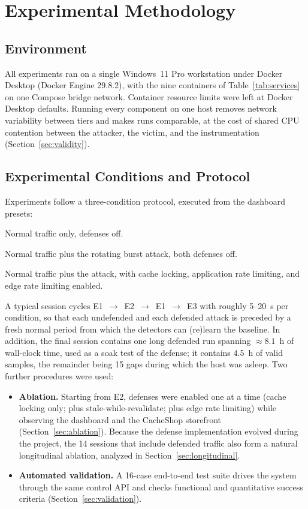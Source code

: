 \section{Experimental Methodology}
\label{sec:method}

\subsection{Environment}
All experiments ran on a single Windows~11 Pro workstation under Docker Desktop
(Docker Engine 29.8.2), with the nine containers of Table~\ref{tab:services} on one
Compose bridge network. Container resource limits were left at Docker Desktop defaults.
Running every component on one host removes network variability between tiers and
makes runs comparable, at the cost of shared CPU contention between the attacker,
the victim, and the instrumentation (Section~\ref{sec:validity}).

\subsection{Experimental Conditions and Protocol}
Experiments follow a three-condition protocol, executed from the dashboard presets:
\begin{description}[leftmargin=1.2em,style=nextline]
\item[E1 -- Baseline.] Normal traffic only, defenses off.
\item[E2 -- Attack, undefended.] Normal traffic plus the rotating burst attack, both
defenses off.
\item[E3 -- Attack, defended.] Normal traffic plus the attack, with cache locking,
application rate limiting, and edge rate limiting enabled.
\end{description}
A typical session cycles E1~$\rightarrow$~E2~$\rightarrow$~E1~$\rightarrow$~E3 with
roughly 5--20~s per condition, so that each undefended and each defended attack is
preceded by a fresh normal period from which the detectors can (re)learn the
baseline. In addition, the final session contains one long defended run spanning
${\approx}8.1$~h of wall-clock time, used as a soak test of the defense; it contains
4.5~h of valid samples, the remainder being 15 gaps during which the host was asleep.
Two further procedures were used:
\begin{itemize}[leftmargin=*]
\item \textbf{Ablation.} Starting from E2, defenses were enabled one at a time (cache
locking only; plus stale-while-revalidate; plus edge rate limiting) while observing the
dashboard and the CacheShop storefront (Section~\ref{sec:ablation}). Because the
defense implementation evolved during the project, the 14 sessions that include
defended traffic also form a natural longitudinal ablation, analyzed in
Section~\ref{sec:longitudinal}.
\item \textbf{Automated validation.} A 16-case end-to-end test suite drives the system
through the same control API and checks functional and quantitative success criteria
(Section~\ref{sec:validation}).
\end{itemize}

